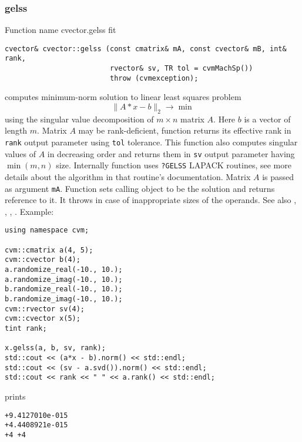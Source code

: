 \subsubsection{gelss}
Function%
\pdfdest name {cvector.gelss} fit
\begin{verbatim}
cvector& cvector::gelss (const cmatrix& mA, const cvector& mB, int& rank,
                         rvector& sv, TR tol = cvmMachSp())
                         throw (cvmexception);
\end{verbatim}
computes  minimum-norm solution to  linear
least squares problem 
\begin{equation*}
\|A*x-b\|_2\to\min
\end{equation*}
using the singular value decomposition of $m\times n$ matrix $A$.
Here $b$ is a vector of length $m$.
Matrix $A$ may be rank-deficient, function returns its effective rank in \verb"rank"
output parameter using \verb"tol" tolerance.
This function also computes
singular values of $A$ in decreasing order and returns them in \verb"sv" output parameter
having $\min(m,n)$ size.
Internally  function uses \verb"?GELSS" LAPACK routines, see more details
about the algorithm in that routine's documentation.
Matrix $A$ is passed as  argument \verb"mA".
Function sets calling object to be the solution and returns reference to it.
It throws
in case of inappropriate sizes of the operands.
See also , 
, , 
.
Example:
\begin{Verbatim}
using namespace cvm;

cvm::cmatrix a(4, 5);
cvm::cvector b(4);
a.randomize_real(-10., 10.);
a.randomize_imag(-10., 10.);
b.randomize_real(-10., 10.);
b.randomize_imag(-10., 10.);
cvm::rvector sv(4);
cvm::cvector x(5);
tint rank;

x.gelss(a, b, sv, rank);
std::cout << (a*x - b).norm() << std::endl;
std::cout << (sv - a.svd()).norm() << std::endl;
std::cout << rank << " " << a.rank() << std::endl;
\end{Verbatim}
prints
\begin{Verbatim}
+9.4127010e-015
+4.4408921e-015
+4 +4
\end{Verbatim}
\newpage



